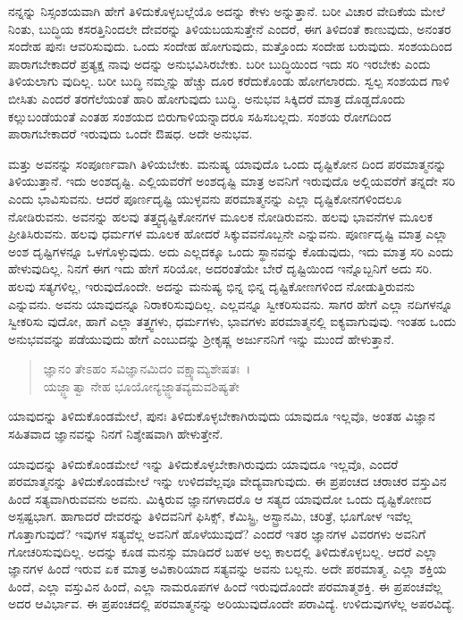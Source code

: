 ನನ್ನನ್ನು ನಿಸ್ಸಂಶಯವಾಗಿ ಹೇಗೆ ತಿಳಿದುಕೊಳ್ಳಬಲ್ಲೆಯೊ ಅದನ್ನು ಕೇಳು ಅನ್ನುತ್ತಾನೆ. ಬರೀ ವಿಚಾರ ವೇದಿಕೆಯ ಮೇಲೆ ನಿಂತು, ಬುದ್ಧಿಯ ಕಸರತ್ತಿನಿಂದಲೇ ದೇವರನ್ನು ತಿಳಿಯಬಯಸುತ್ತೇನೆ ಎಂದರೆ, ಈಗ ತಿಳಿದಂತೆ ಕಾಣುವುದು, ಅನಂತರ ಸಂದೇಹ ಪುನಃ ಆವರಿಸುವುದು. ಒಂದು ಸಂದೇಹ ಹೋಗುವುದು, ಮತ್ತೊಂದು ಸಂದೇಹ ಬರುವುದು. ಸಂಶಯದಿಂದ ಪಾರಾಗಬೇಕಾದರೆ ಪ್ರತ್ಯಕ್ಷ ನಾವು ಅದನ್ನು ಅನುಭವಿಸಿರಬೇಕು. ಬರೀ ಬುದ್ಧಿಯಿಂದ ಇದು ಸರಿ ಇರಬೇಕು ಎಂದು ತಿಳಿಯಲಾಗು ವುದಿಲ್ಲ. ಬರೀ ಬುದ್ಧಿ ನಮ್ಮನ್ನು ಹೆಚ್ಚು ದೂರ ಕರೆದುಕೊಂಡು ಹೋಗಲಾರದು. ಸ್ವಲ್ಪ ಸಂಶಯದ ಗಾಳಿ ಬೀಸಿತು ಎಂದರೆ ತರಗೆಲೆಯಂತೆ ಹಾರಿ ಹೋಗುವುದು ಬುದ್ಧಿ. ಅನುಭವ ಸಿಕ್ಕಿದರೆ ಮಾತ್ರ ದೊಡ್ಡದೊಂದು ಕಲ್ಲುಬಂಡೆಯಂತೆ ಎಂತಹ ಸಂಶಯದ ಬಿರುಗಾಳಿಯನ್ನಾದರೂ ಸಹಿಸಬಲ್ಲದು. ಸಂಶಯ ರೋಗದಿಂದ ಪಾರಾಗಬೇಕಾದರೆ ಇರುವುದು ಒಂದೇ ಔಷಧ. ಅದೇ ಅನುಭವ. 

ಮತ್ತು ಅವನನ್ನು ಸಂಪೂರ್ಣವಾಗಿ ತಿಳಿಯಬೇಕು. ಮನುಷ್ಯ ಯಾವುದೊ ಒಂದು ದೃಷ್ಟಿಕೋನ ದಿಂದ ಪರಮಾತ್ಮನನ್ನು ತಿಳಿಯುತ್ತಾನೆ. ಇದು ಅಂಶದೃಷ್ಟಿ. ಎಲ್ಲಿಯವರೆಗೆ ಅಂಶದೃಷ್ಟಿ ಮಾತ್ರ ಅವನಿಗೆ ಇರುವುದೊ ಅಲ್ಲಿಯವರೆಗೆ ತನ್ನದೇ ಸರಿ ಎಂದು ಭಾವಿಸುವನು. ಆದರೆ ಪೂರ್ಣದೃಷ್ಟಿ ಯುಳ್ಳವನು ಪರಮಾತ್ಮನನ್ನು ಎಲ್ಲಾ ದೃಷ್ಟಿಕೋನಗಳಿಂದಲೂ ನೋಡಿರುವನು. ಅವನನ್ನು ಹಲವು ತತ್ತ್ವದೃಷ್ಟಿಕೋನಗಳ ಮೂಲಕ ನೋಡಿರುವನು. ಹಲವು ಭಾವನೆಗಳ ಮೂಲಕ ಪ್ರೀತಿಸಿರುವನು. ಹಲವು ಧರ್ಮಗಳ ಮೂಲಕ ಹೋದರೆ ಸಿಕ್ಕುವವನೊಬ್ಬನೇ ಎನ್ನುವನು. ಪೂರ್ಣದೃಷ್ಟಿ ಮಾತ್ರ ಎಲ್ಲಾ ಅಂಶ ದೃಷ್ಟಿಗಳನ್ನೂ ಒಳಗೊಳ್ಳುವುದು. ಅದು ಎಲ್ಲದಕ್ಕೂ ಒಂದು ಸ್ಥಾನವನ್ನು ಕೊಡುವುದು, ಇದು ಮಾತ್ರ ಸರಿ ಎಂದು ಹೇಳುವುದಿಲ್ಲ. ನಿನಗೆ ಈಗ ಇದು ಹೇಗೆ ಸರಿಯೋ, ಅದರಂತೆಯೇ ಬೇರೆ ದೃಷ್ಟಿಯಿಂದ ಇನ್ನೊಬ್ಬನಿಗೆ ಅದು ಸರಿ. ಹಲವು ಸತ್ಯಗಳಿಲ್ಲ, ಇರುವುದೊಂದೇ. ಅದನ್ನು ಮನುಷ್ಯ ಭಿನ್ನ ಭಿನ್ನ ದೃಷ್ಟಿಕೋಣಗಳಿಂದ ನೋಡುತ್ತಿರುವನು ಎನ್ನುವನು. ಅವನು ಯಾವುದನ್ನೂ ನಿರಾಕರಿಸುವುದಿಲ್ಲ. ಎಲ್ಲವನ್ನೂ ಸ್ವೀಕರಿಸುವನು. ಸಾಗರ ಹೇಗೆ ಎಲ್ಲಾ ನದಿಗಳನ್ನೂ ಸ್ವೀಕರಿಸು ವುದೋ, ಹಾಗೆ ಎಲ್ಲಾ ತತ್ತ್ವಗಳು, ಧರ್ಮಗಳು, ಭಾವಗಳು ಪರಮಾತ್ಮನಲ್ಲಿ ಐಕ್ಯವಾಗುವುವು. ಇಂತಹ ಒಂದು ಅನುಭವವನ್ನು ಪಡೆಯುವುದು ಹೇಗೆ ಎಂಬುದನ್ನು ಶ‍್ರೀಕೃಷ್ಣ ಅರ್ಜುನನಿಗೆ ಇನ್ನು ಮುಂದೆ ಹೇಳುತ್ತಾನೆ.

\begin{verse}
ಜ್ಞಾನಂ ತೇಽಹಂ ಸವಿಜ್ಞಾನಮಿದಂ ವಕ್ಷ್ಯಾಮ್ಯಶೇಷತಃ~।\\ಯಜ್ಜ್ಞಾತ್ವಾ ನೇಹ ಭೂಯೋನ್ಯಜ್ಜ್ಞಾತವ್ಯಮವಶಿಷ್ಯತೇ 
\end{verse}

{\small ಯಾವುದನ್ನು ತಿಳಿದುಕೊಂಡಮೇಲೆ, ಪುನಃ ತಿಳಿದುಕೊಳ್ಳಬೇಕಾಗಿರುವುದು ಯಾವುದೂ ಇಲ್ಲವೊ, ಅಂತಹ ವಿಜ್ಞಾನ ಸಹಿತವಾದ ಜ್ಞಾನವನ್ನು ನಿನಗೆ ನಿಶ್ಶೇಷವಾಗಿ ಹೇಳುತ್ತೇನೆ.}

ಯಾವುದನ್ನು ತಿಳಿದುಕೊಂಡಮೇಲೆ ಇನ್ನು ತಿಳಿದುಕೊಳ್ಳಬೇಕಾಗಿರುವುದು ಯಾವುದೂ ಇಲ್ಲವೊ, ಎಂದರೆ ಪರಮಾತ್ಮನನ್ನು ತಿಳಿದುಕೊಂಡಮೇಲೆ ಇನ್ನು ಉಳಿದವೆಲ್ಲವೂ ವೇದ್ಯವಾಗುವುದು. ಈ ಪ್ರಪಂಚದ ಚರಾಚರ ವಸ್ತುವಿನ ಹಿಂದೆ ಸತ್ಯವಾಗಿರುವವನು ಅವನು. ಮಿಕ್ಕಿರುವ ಜ್ಞಾನಗಳಾದರೊ ಆ ಸತ್ಯದ ಯಾವುದೋ ಒಂದು ದೃಷ್ಟಿಕೋಣದ ಅಸ್ಪಷ್ಟಭಾಗ. ಹಾಗಾದರೆ ದೇವರನ್ನು ತಿಳಿದವನಿಗೆ ಫಿಸಿಕ್ಸ್, ಕೆಮಿಸ್ಟ್ರಿ, ಅಸ್ಟ್ರಾನಮಿ, ಚರಿತ್ರೆ, ಭೂಗೋಳ ಇವೆಲ್ಲ ಗೊತ್ತಾಗುವುದೆ? ಇವುಗಳ ಸತ್ಯವೆಲ್ಲ ಅವನಿಗೆ ಹೊಳೆಯುವುದೆ? ಎಂದರೆ ಇತರ ಜ್ಞಾನಗಳ ವಿವರಗಳು ಅವನಿಗೆ ಗೋಚರಿಸುವುದಿಲ್ಲ. ಅದನ್ನು ಕೂಡ ಮನಸ್ಸು ಮಾಡಿದರೆ ಬಹಳ ಅಲ್ಪ ಕಾಲದಲ್ಲಿ ತಿಳಿದುಕೊಳ್ಳಬಲ್ಲ. ಆದರೆ ಎಲ್ಲಾ ಜ್ಞಾನಗಳ ಹಿಂದೆ ಇರುವ ಏಕ ಮಾತ್ರ ಅವಿಕಾರಿಯಾದ ಸತ್ಯವನ್ನು ಅವನು ಬಲ್ಲನು. ಅದೇ ಪರಮಾತ್ಮ. ಎಲ್ಲಾ ಶಕ್ತಿಯ ಹಿಂದೆ, ಎಲ್ಲಾ ವಸ್ತುವಿನ ಹಿಂದೆ, ಎಲ್ಲಾ ನಾಮರೂಪಗಳ ಹಿಂದೆ ಇರುವುದೊಂದೇ ಪರಮಾತ್ಮಶಕ್ತಿ. ಈ ಪ್ರಪಂಚವೆಲ್ಲ ಅದರ ಆವಿರ್ಭಾವ. ಈ ಪ್ರಪಂಚದಲ್ಲಿ ಪರಮಾತ್ಮನನ್ನು ಅರಿಯುವುದೊಂದೇ ಪರಾವಿದ್ಯೆ. ಉಳಿದುವುಗಳೆಲ್ಲ ಅಪರವಿದ್ಯೆ.

